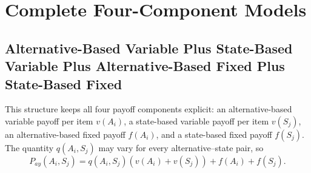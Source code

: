 	\section{Complete Four-Component Models}
	\label{sec:complete-models}


\subsection{Alternative-Based Variable Plus State-Based Variable Plus Alternative-Based Fixed Plus State-Based Fixed}
	\label{sec:alternative-based-and-state-based-variable-payoffs-plus-alternative-based-and-state-based-fixed-payoffs}

	This structure keeps all four payoff components explicit: an alternative-based variable payoff per item $v(A_i)$, a state-based variable payoff per item $v(S_j)$, an alternative-based fixed payoff $f(A_i)$, and a state-based fixed payoff $f(S_j)$. The quantity $q(A_i,S_j)$ may vary for every alternative--state pair, so
	\[P_{ay}(A_i,S_j)=q(A_i,S_j)\left(v(A_i)+v(S_j)\right)+f(A_i)+f(S_j).\]


